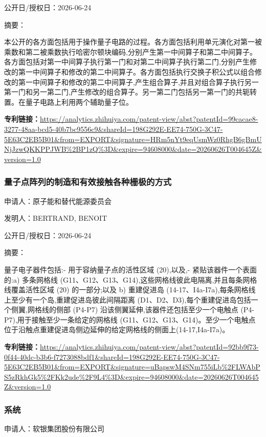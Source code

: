 \documentclass[12pt,a4paper]{ctexart}
\begin{document}
公开日/授权日：2026-06-24

摘要：

本公开的各方面包括用于操作量子电路的过程。各方面包括利用单元演化对第一被乘数和第二被乘数执行哈密尔顿块编码,分别产生第一中间算子和第二中间算子。各方面包括对第一中间算子执行第一门和对第二中间算子执行第二门,分别产生修改的第一中间算子和修改的第二中间算子。各方面包括执行交换子积公式以组合修改的第一中间算子和修改的第二中间算子,产生组合算子,并且对组合算子执行另一第一门和另一第二门,产生修改的组合算子。另一第二门包括另一第一门的共轭转置。在量子电路上利用两个辅助量子位。

\noindent\textbf{专利链接：}\url{https://analytics.zhihuiya.com/patent-view/abst?patentId=99cacae8-3277-48aa-bcd5-40b7bc9556c9&shareId=198G292E-EE74-750G-3C47-5E63C2EB5B01&from=EXPORT&signature=HRm5nYt9eqUsmWz0RhgB6gBmUNjJzwQKKPPJWB%2BP1zQ%3D&expire=94608000&date=20260626T004645Z&version=1.0}

\subsubsection{ 量子点阵列的制造和有效接触各种栅极的方式 }

申请人：原子能和替代能源委员会

发明人：BERTRAND, BENOIT

公开日/授权日：2026-06-24

摘要：

量子电子器件包括:- 用于容纳量子点的活性区域 (20),以及,- 紧贴该器件一个表面的:a) 多条网格线 (G11、G12、G13、G14),这些网格线彼此电隔离,并且每条网格线覆盖活性区域 (20) 的一部分;以及 b) 重建促进岛 (14-17、I4a-I7a),每条网格线上至少有一个岛,重建促进岛彼此间隔距离 (D1、D2、D3),每个重建促进岛包括一个侧翼,网格线的侧部 (P4-P7) 沿该侧翼延伸,该器件还包括至少一个电触点 (P4-P7),用于接触至少一条给定的网格线 (G11、G12、G13、G14)。至少一个电触点位于沿触点重建促进岛侧边延伸的给定网格线的侧面上(14-17,I4a-I7a)。

\noindent\textbf{专利链接：}\url{https://analytics.zhihuiya.com/patent-view/abst?patentId=92bb9f73-0f44-40dc-b3b6-f7273088bdf1&shareId=198G292E-EE74-750G-3C47-5E63C2EB5B01&from=EXPORT&signature=uBapswM4SNm755iLb%2FLWAbPS5zRkhGk5%2FKk2ude%2F9L4%3D&expire=94608000&date=20260626T004645Z&version=1.0}

\subsubsection{ 系统 }

申请人：软银集团股份有限公司
\end{document}
